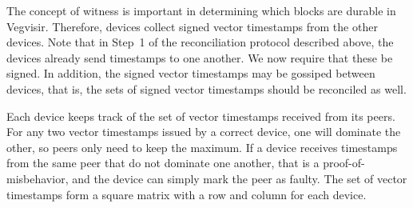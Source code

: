 \documentclass{article}
\begin{document}
The concept of witness is important in determining which blocks are durable in Vegvisir.
Therefore, devices collect signed vector timestamps from the other devices.  Note that in Step~1
of the reconciliation protocol described above, the devices already send timestamps to one another.
We now require that these be signed.  In addition, the signed vector timestamps may be gossiped
between devices, that is, the sets of signed vector timestamps should be reconciled as well.

Each device keeps track of the set of vector timestamps received from its peers.  For any two
vector timestamps issued by a correct device, one will dominate the other, so peers only need to
keep the maximum.  If a device receives timestamps from the same peer that do not dominate one
another, that is a proof-of-misbehavior, and the device can simply mark the peer as faulty.
The set of vector timestamps form a square matrix with a row and column for each device.
\end{document}
